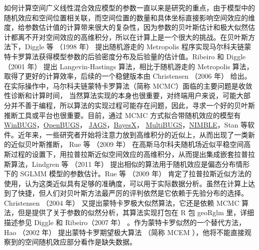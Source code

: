 \documentclass[12pt,a4paper,UTF8,twoside]{book}
\theoremstyle{definition}
\theoremstyle{definition}
\theoremstyle{definition}
\theoremstyle{remark}
\begin{document}
如何计算空间广义线性混合效应模型的参数一直以来是研究的重点，由于模型中的随机效应和空间位置相关联，而空间位置的数量和具体坐标直接影响空间效应的维度，给参数估计值的计算带来很大的复杂性，因为参数的贝叶斯估计和极大似然估计都离不开对空间效应的高维积分，所以在计算上是一个很大的挑战。在贝叶斯方法下，Diggle
等 （1998 年） \citep{Diggle1998} 提出随机游走的 Metropolis
程序实现马尔科夫链蒙特卡罗算法获得模型参数的后验密度分布及后验量的估计值。Ribeiro
和 Diggle （2001 年） \citep{geoR2001} 提出 Langevin-Hastings
算法，相比于随机游走的 Metropolis
算法，取得了更好的计算效率，后续的一个稳健版本由 Christensen （2006 年）
\citep{Christensen2006} 给出。在实际操作中，马尔科夫链蒙特卡罗算法（简称
MCMC）面临的主要问题是收敛性诊断和计算时间，
当然算法实现的本身也很重要，对终端用户来说，可能大部分并不善于编程，所以算法的实现过程可能存在问题，因此，寻求一个好的贝叶斯推断工具或平台也很重要。目前，通过
MCMC 方式拟合带随机效应的模型有
\href{http://www.mrc-bsu.cam.ac.uk/software/bugs/the-bugs-project-winbugs/}{WinBUGS}，\href{http://www.openbugs.net/}{OpenBUGS}，
\href{http://mcmc-jags.sourceforge.net/}{JAGS}，\href{http://www.BayesX.org}{BayesX}，
\href{https://www.multibugs.org}{MultiBUGS}，\href{https://r-nimble.org/}{NIMBLE}，Stan
\citep{Stan2017JSS}
等软件。近年来，一些研究者开始将注意力放到高维积分的近似上，从而出现了一类新的近似贝叶斯推断，
Rue 等 （2009 年） \citep{Rue2009}
在高斯马尔科夫随机场近似平稳空间高斯过程的设置下，用拉普拉斯近似空间效应的高维积分，从而提出集成嵌套拉普拉斯算法，Lindgren
等 （2011 年） \citep{Lindgren2011}
提出相似的算法用于随机效应是偏态分布情形下的 SGLMM 模型的参数估计。Rue
等 （2009 年） \citep{Rue2009}
肯定了拉普拉斯近似方法的使用，认为这类近似具有足够的准确度，可以用于实际数据分析。虽然在计算上达到了快捷，但人们对贝叶斯方法最严厉的评判依然是它依赖于先验分布的选择。
Christensen （2004 年） \citep{Christensen2004}
又提出蒙特卡罗极大似然算法，它还是依赖 MCMC
算法，但是提供了关于参数的似然分析，其算法实现打包在 R 包 geoRglm
里，详细描述参见 Diggle 和 Ribeiro（2007 年）
\citep{Diggle2007}。作为蒙特卡罗似然的一个替代方法， Hao （2002
年）\citep{Zhang2002On} 提出蒙特卡罗期望极大算法 （简称 MCEM
），他将不能直接观察到的空间随机效应部分看作是缺失数据。
\end{document}
